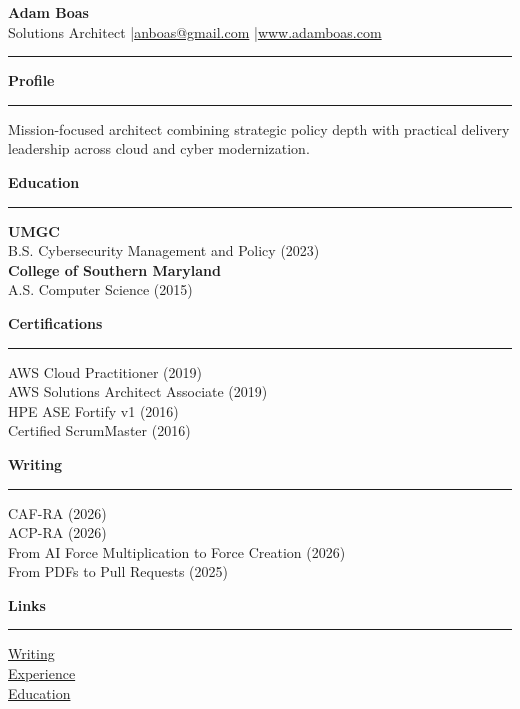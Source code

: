 \documentclass[10pt]{article}
\newcommand{\LeftSection}[1]{\vspace{0.35em}\textbf{\normalsize #1}\par\textcolor{accentgold}{\rule{\linewidth}{0.7pt}}\vspace{0.15em}}
\begin{document}

{\LARGE\bfseries Adam Boas}\\[-0.1em]
\small Solutions Architect \quad|\quad \href{mailto:anboas@gmail.com}{anboas@gmail.com} \quad|\quad \href{https://www.adamboas.com}{www.adamboas.com}
\vspace{0.25em}
\textcolor{accentgold}{\rule{\textwidth}{1pt}}

\begin{minipage}[t]{0.32\textwidth}
\LeftSection{Profile}
Mission-focused architect combining strategic policy depth with practical delivery leadership across cloud and cyber modernization.

\LeftSection{Education}
\textbf{UMGC}\\
B.S. Cybersecurity Management and Policy (2023)\\[0.2em]
\textbf{College of Southern Maryland}\\
A.S. Computer Science (2015)

\LeftSection{Certifications}
AWS Cloud Practitioner (2019)\\
AWS Solutions Architect Associate (2019)\\
HPE ASE Fortify v1 (2016)\\
Certified ScrumMaster (2016)

\LeftSection{Writing}
CAF-RA (2026)\\
ACP-RA (2026)\\
From AI Force Multiplication to Force Creation (2026)\\
From PDFs to Pull Requests (2025)

\LeftSection{Links}
\href{https://www.adamboas.com/writing/}{Writing}\\
\href{https://www.adamboas.com/experience/}{Experience}\\
\href{https://www.adamboas.com/education/}{Education}
\end{minipage}
\hfill
\end{document}

